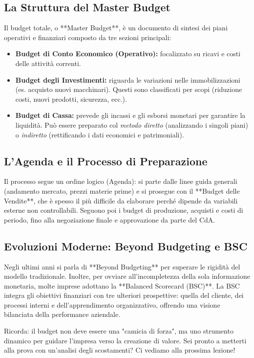 \documentclass[a4paper,10pt]{article}
\begin{document}
\subsection*{La Struttura del Master Budget}

Il budget totale, o **Master Budget**, è un documento di sintesi dei piani operativi e finanziari composto da tre sezioni principali:
\begin{itemize}
    \item \textbf{Budget di Conto Economico (Operativo):} focalizzato su ricavi e costi delle attività correnti.
    \item \textbf{Budget degli Investimenti:} riguarda le variazioni nelle immobilizzazioni (es. acquisto nuovi macchinari). Questi sono classificati per scopi (riduzione costi, nuovi prodotti, sicurezza, ecc.).
    \item \textbf{Budget di Cassa:} prevede gli incassi e gli esborsi monetari per garantire la liquidità. Può essere preparato col \textit{metodo diretto} (analizzando i singoli piani) o \textit{indiretto} (rettificando i dati economici e patrimoniali).
\end{itemize}

\subsection*{L’Agenda e il Processo di Preparazione}

Il processo segue un ordine logico (Agenda): si parte dalle linee guida generali (andamento mercato, prezzi materie prime) e si prosegue con il **Budget delle Vendite**, che è spesso il più difficile da elaborare perché dipende da variabili esterne non controllabili. Seguono poi i budget di produzione, acquisti e costi di periodo, fino alla negoziazione finale e approvazione da parte del CdA.

\subsection*{Evoluzioni Moderne: Beyond Budgeting e BSC}

Negli ultimi anni si parla di **Beyond Budgeting** per superare le rigidità del modello tradizionale. Inoltre, per ovviare all'incompletezza della sola informazione monetaria, molte imprese adottano la **Balanced Scorecard (BSC)**. La BSC integra gli obiettivi finanziari con tre ulteriori prospettive: quella del cliente, dei processi interni e dell'apprendimento organizzativo, offrendo una visione bilanciata della performance aziendale.

Ricorda: il budget non deve essere una "camicia di forza", ma uno strumento dinamico per guidare l'impresa verso la creazione di valore. Sei pronto a metterti alla prova con un'analisi degli scostamenti? Ci vediamo alla prossima lezione!
\end{document}
